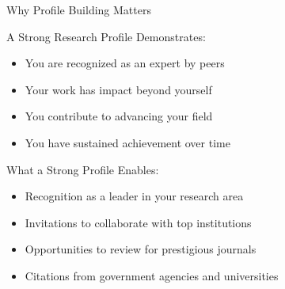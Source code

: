 \documentclass[11pt]{beamer}
\begin{document}
	\begin{frame}{Why Profile Building Matters}
		\scriptsize
		\begin{block}{A Strong Research Profile Demonstrates:}
			\begin{itemize}
				\item You are recognized as an expert by peers
				\item Your work has impact beyond yourself
				\item You contribute to advancing your field
				\item You have sustained achievement over time
			\end{itemize}
		\end{block}
		\begin{block}{What a Strong Profile Enables:}
			\begin{itemize}
				\item Recognition as a leader in your research area
				\item Invitations to collaborate with top institutions
				\item Opportunities to review for prestigious journals
				\item Citations from government agencies and universities
			\end{itemize}
		\end{block}
	\end{frame}
	
\end{document}
